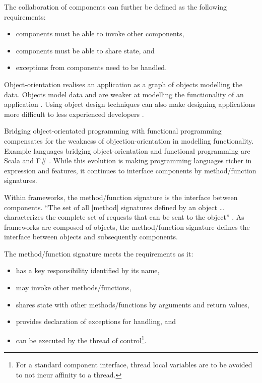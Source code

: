 \documentclass[prodmode]{style/acmlarge}
\begin{document}
The collaboration of components can further be defined as the following
requirements:
\begin{itemize}
  \item components must be able to invoke other components,
  \item components must be able to share state, and
  \item exceptions from components need to be handled.
\end{itemize}

Object-orientation realises an application as a graph of objects modelling the
data.  Objects model data and are weaker at modelling the functionality of an
application \cite{oo-behaviour}.  Using object design techniques can also make
designing applications more difficult to less experienced developers
\cite{oo-design}.

Bridging object-orientated programming with functional programming
\cite{bridging-function-oo} compensates for the weakness of
objection-orientation in modelling functionality.  Example languages bridging
object-orientation and functional programming are Scala \cite{scala} and F\#
\cite{f-sharp}.  While this evolution is making programming languages richer in
expression and features, it continues to interface components by method/function
signatures.

Within frameworks, the method/function signature is the interface between
components.  ``The set of all [method] signatures defined by an object \ldots
characterizes the complete set of requests that can be sent to the object''
\cite[p. 13]{gof}.  As frameworks are composed of objects, the method/function
signature defines the interface between objects and subsequently components.

The method/function signature meets the requirements as it:
\begin{itemize}
  \item has a key responsibility identified by its name,
  \item may invoke other methods/functions,
  \item shares state with other methods/functions by arguments and return values,
  \item provides declaration of exceptions for handling, and
  \item can be executed by the thread of control\footnote{For a standard component interface, thread local variables are to be avoided to not incur affinity to a thread.}.
\end{itemize}
\end{document}
